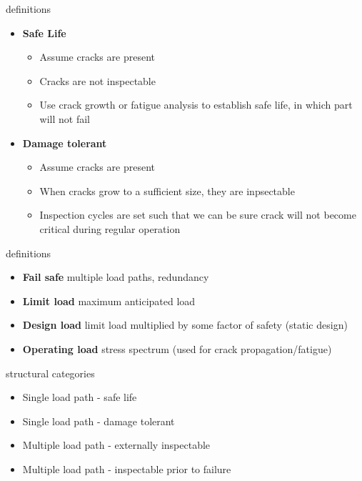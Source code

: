 \documentclass[10pt]{beamer}
\begin{document}
	\begin{frame}{definitions}
		\begin{itemize}[<+->]
			\item \textbf{Safe Life}
			\begin{itemize}
				\item Assume cracks are present
				\item Cracks are not inspectable
				\item Use crack growth or fatigue analysis to establish safe life, in which part will not fail
			\end{itemize}
			\item \textbf{Damage tolerant}
			\begin{itemize}
				\item Assume cracks are present
				\item When cracks grow to a sufficient size, they are inpsectable
				\item Inspection cycles are set such that we can be sure crack will not become critical during regular operation
			\end{itemize}
		\end{itemize}
	\end{frame}
	
	\begin{frame}{definitions}
		\begin{itemize}[<+->]
			\item \textbf{Fail safe} multiple load paths, redundancy 
			\item \textbf{Limit load} maximum anticipated load
			\item \textbf{Design load} limit load multiplied by some factor of safety (static design)
			\item \textbf{Operating load} stress spectrum (used for crack propagation/fatigue)
		\end{itemize}
	\end{frame}
	
	\begin{frame}{structural categories}
		\begin{itemize}[<+->]
			\item Single load path - safe life
			\item Single load path - damage tolerant
			\item Multiple load path - externally inspectable
			\item Multiple load path - inspectable prior to failure
		\end{itemize}
	\end{frame}
	
\end{document}
